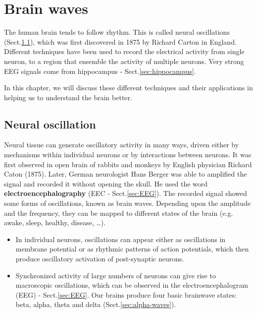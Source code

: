 \chapter{Brain waves}
\label{chap:EEG}

The human brain tends to follow rhythm. This is called neural oscillations
(Sect.\ref{sec:neural-oscillations}), which was first discovered in 1875 by
Richard Carton in England. Different techniques have been used to record the
electrical activity from single neuron, to a region that ensemble the activity
of multiple neurons. Very strong EEG signals come from hippocampus -
Sect.\ref{sec:hippocampus}.

In this chapter, we will discuss these different techniques and their
applications in helping us to understand the brain better.

\section{Neural oscillation}
\label{sec:neural-oscillations}

Neural tissue can generate oscillatory activity in many ways, driven either by
mechanisms within individual neurons or by interactions between neurons. 
It was first observed in open brain of rabbits and monkeys by English physician
Richard Caton (1875). Later, German neurologist Hans Berger was able to
amplified the signal and recorded it without opening the skull. He used the word
{\bf electroencephalography} (EEC - Sect.\ref{sec:EEG}).
The recorded signal showed some forms of oscillations, known as brain waves.
Depending upon the amplitude and the frequency, they can be mapped to different
states of the brain (e.g. awake, sleep, healthy, disease, \ldots).

\begin{itemize}  
  \item  In individual neurons, oscillations can appear either as oscillations
  in membrane potential or as rhythmic patterns of action potentials, which then
  produce oscillatory activation of post-synaptic neurons.
  
  \item Synchronized activity of large numbers of neurons can give rise to
  macroscopic oscillations, which can be observed in the electroencephalogram
  (EEG) - Sect.\ref{sec:EEG}. Our brains produce four basic brainwave states:
  beta, alpha, theta and delta 
(Sect.\ref{sec:alpha-waves}).
\end{itemize}


